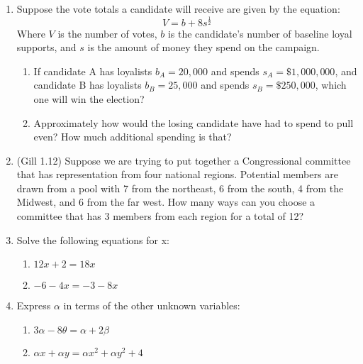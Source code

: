 \documentclass[11pt]{article}
\begin{document}
\begin{enumerate}
\item Suppose the vote totals a candidate will receive are given by the equation:
\begin{equation*}
V = b + 8s^{\frac{1}{2}}
\end{equation*}
Where $V$ is the number of votes, $b$ is the candidate's number of baseline loyal supports, and $s$ is the amount of money they spend on the campaign.
\begin{enumerate}
\item If candidate A has loyalists $b_A = 20,000$ and spends $s_A = \$1,000,000$, and candidate B has loyalists $b_B = 25,000$ and spends $s_B = \$250,000$, which one will win the election? %
\item Approximately how would the losing candidate have had to spend to pull even?  How much additional spending is that? %
\end{enumerate}


\item (Gill 1.12) Suppose we are trying to put together a Congressional committee that has representation from four national regions.  Potential members are drawn from a pool with 7 from the northeast, 6 from the south, 4 from the Midwest, and 6 from the far west.  How many ways can you choose a committee that has 3 members from each region for a total of 12?\\ %





\item Solve the following equations for x:
\begin{enumerate}
\item $12x + 2 = 18x$ %
\item $-6 - 4x = -3 - 8x$  %
\end{enumerate}


\item Express $\alpha$ in terms of the other unknown variables:
\begin{enumerate}
\item $3\alpha - 8\theta = \alpha + 2\beta$ %
\item $\alpha x + \alpha y = \alpha x^2 + \alpha y^2 + 4$ %
\end{enumerate}



\end{enumerate}
\end{document}
